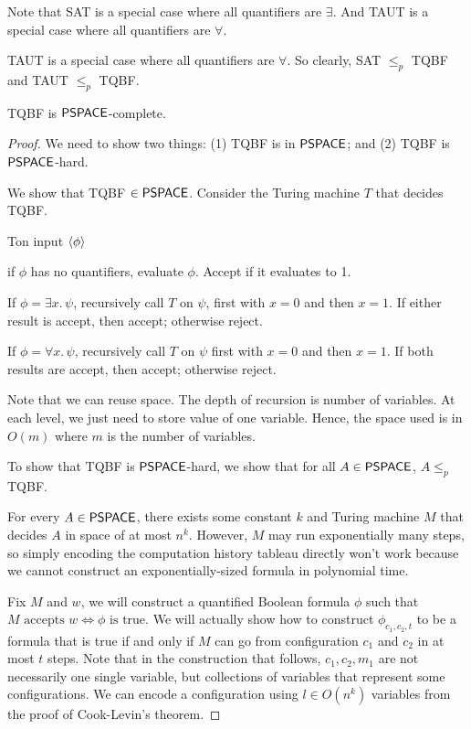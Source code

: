 Note that SAT is a special case where all quantifiers are $\exists$. And TAUT is a special case where all quantifiers are $\forall$.

TAUT is a special case where all quantifiers are $\forall$. So clearly, SAT $\leq_p$ TQBF and TAUT $\leq_p$ TQBF.

\begin{theorem}
    TQBF is $\mathsf{PSPACE}$-complete.
\end{theorem}

\begin{proof}
    We need to show two things: (1) TQBF is in $\mathsf{PSPACE}$; and (2) TQBF is $\mathsf{PSPACE}$-hard.

    We show that TQBF $\in \mathsf{PSPACE}$. Consider the Turing machine $T$ that decides TQBF.

    \begin{turing}{T}{on input $\langle \phi \rangle$}
        \item if $\phi$ has no quantifiers, evaluate $\phi$. Accept if it evaluates to 1.
        \item If $\phi = \exists x.\, \psi$, recursively call $T$ on $\psi$, first with $x=0$ and then $x=1$. If either result is accept, then accept; otherwise reject.
        \item If $\phi = \forall x.\, \psi$, recursively call $T$ on $\psi$ first with $x=0$ and then $x=1$. If both results are accept, then accept; otherwise reject.
    \end{turing}

    Note that we can reuse space. The depth of recursion is number of variables. At each level, we just need to store value of one variable. Hence, the space used is in $O(m)$ where $m$ is the number of variables.

    To show that TQBF is $\mathsf{PSPACE}$-hard, we show that for all $A \in \mathsf{PSPACE}$, $A \leq_p$ TQBF.

    For every $A \in \mathsf{PSPACE}$, there exists some constant $k$ and Turing machine $M$ that decides $A$ in space of at most $n^k$. However, $M$ may run exponentially many steps, so simply encoding the computation history tableau directly won't work because we cannot construct an exponentially-sized formula in polynomial time.

    Fix $M$ and $w$, we will construct a quantified Boolean formula $\phi$ such that $\text{$M$ accepts $w$} \iff \text{$\phi$ is true}$. We will actually show how to construct $\phi_{c_1,c_2,t}$ to be a formula that is true if and only if $M$ can go from configuration $c_1$ and $c_2$ in at most $t$ steps. Note that in the construction that follows, $c_1,c_2,m_1$ are not necessarily one single variable, but collections of variables that represent some configurations. We can encode a configuration using $l \in O(n^k)$ variables from the proof of Cook-Levin's theorem.


\end{proof}
